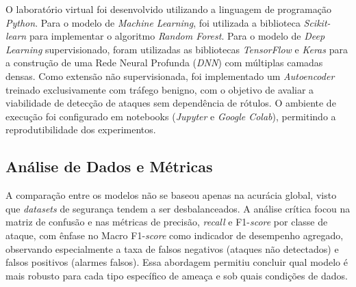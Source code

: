 O laboratório virtual foi desenvolvido utilizando a linguagem de programação \textit{Python}. Para o modelo de \textit{Machine Learning}, foi utilizada a biblioteca \textit{Scikit-learn} para implementar o algoritmo \textit{Random Forest}. Para o modelo de \textit{Deep Learning} supervisionado, foram utilizadas as bibliotecas \textit{TensorFlow} e \textit{Keras} para a construção de uma Rede Neural Profunda (\textit{DNN}) com múltiplas camadas densas. Como extensão não supervisionada, foi implementado um \textit{Autoencoder} treinado exclusivamente com tráfego benigno, com o objetivo de avaliar a viabilidade de detecção de ataques sem dependência de rótulos. O ambiente de execução foi configurado em notebooks (\textit{Jupyter} e \textit{Google Colab}), permitindo a reprodutibilidade dos experimentos.

\subsection{Análise de Dados e Métricas}

A comparação entre os modelos não se baseou apenas na acurácia global, visto que \textit{datasets} de segurança tendem a ser desbalanceados. A análise crítica focou na matriz de confusão e nas métricas de precisão, \textit{recall} e F1-\textit{score} por classe de ataque, com ênfase no Macro F1-\textit{score} como indicador de desempenho agregado, observando especialmente a taxa de falsos negativos (ataques não detectados) e falsos positivos (alarmes falsos). Essa abordagem permitiu concluir qual modelo é mais robusto para cada tipo específico de ameaça e sob quais condições de dados.
